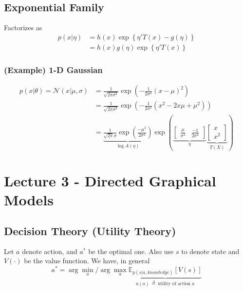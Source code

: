 \documentclass[11pt]{article}
\newcommand{\argmax}{\arg\max}
\begin{document}
\subsection{Exponential Family}
Factorizes as
\begin{align*}
    p(x | \eta) 
    &=h(x) \exp \left\{\eta' T(x)-g(\eta)\right\} \\
    &=h(x) g(\eta) \exp \left\{\eta' T(x)\right\}
\end{align*}
\subsubsection{(Example) 1-D Gaussian}
\begin{align*}
    p(x|\theta) = \mathcal{N}(x|\mu, \sigma)
    &= \frac{1}{\sqrt{2\pi \sigma^2}}\exp \left(- \frac{1}{2\sigma^2} (x - \mu)^2 \right) \\
    &= \frac{1}{\sqrt{2\pi \sigma^2}}\exp \left(- \frac{1}{2\sigma^2} (x^2 - 2x\mu + \mu^2) \right) \\
    &= \underbrace{
        \frac{1}{\sqrt{2\pi}\sigma} \exp\left( \frac{-\mu^2}{2\sigma^2} \right)}_{\log A(\eta)}
    \exp\left(
    \underbrace{
        \begin{bmatrix}
            \frac{\mu}{\sigma^2} 
            & \frac{-1}{2\sigma^2}
        \end{bmatrix}}_{\eta}
    \underbrace{
        \begin{bmatrix}
            x \\
            x^2
        \end{bmatrix}}_{T(X)}
    \right)
\end{align*}



\section{Lecture 3 - Directed Graphical Models}
\subsection{Decision Theory (Utility Theory)}
Let $a$ denote action, and $a^*$ be the optimal one. Also use $s$ to denote state and $V(\cdot)$ be the value function. We have, in general
\begin{equation*}
    a^* = \arg\min_a/\argmax_a \underbrace{{\mathbb{E}}_{p(s\vert a, knowledge)}\left[V(s)\right]}_{u(a)~ \overset{\Delta}{=} ~\text{utility of action $a$}}
\end{equation*}
\end{document}
